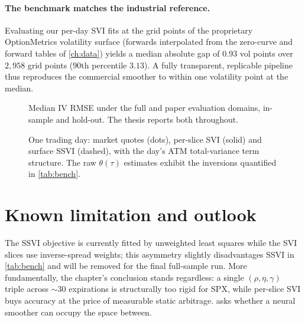 \paragraph{The benchmark matches the industrial reference.} Evaluating our
per-day SVI fits at the grid points of the proprietary OptionMetrics
volatility surface (forwards interpolated from the zero-curve and forward
tables of \cref{ch:data}) yields a median absolute gap of $0.93$ vol points
over $2{,}958$ grid points ($90$th percentile $3.13$). A fully transparent,
replicable pipeline thus reproduces the commercial smoother to within one
volatility point at the median.

\begin{figure}[t]
  \centering
  \caption[Benchmark under both evaluation domains]{Median IV RMSE under the
  full and paper evaluation domains, in-sample and hold-out. The thesis
  reports both throughout.}
  \label{fig:domains}
\end{figure}

\begin{figure}[t]
  \centering
  \caption[A full trading day under the parametric benchmark]{One trading day:
  market quotes (dots), per-slice SVI (solid) and surface SSVI (dashed), with
  the day's ATM total-variance term structure. The raw $\theta(\tau)$
  estimates exhibit the inversions quantified in \cref{tab:bench}.}
  \label{fig:daysmiles}
\end{figure}

\section{Known limitation and outlook}
The SSVI objective is currently fitted by unweighted least squares while the
SVI slices use inverse-spread weights; this asymmetry slightly disadvantages
SSVI in \cref{tab:bench} and will be removed for the final full-sample run.
More fundamentally, the chapter's conclusion stands regardless: a single
$(\rho,\eta,\gamma)$ triple across $\sim$30 expirations is structurally too
rigid for SPX, while per-slice SVI buys accuracy at the price of measurable
static arbitrage.  asks whether a neural smoother can
occupy the space between.
